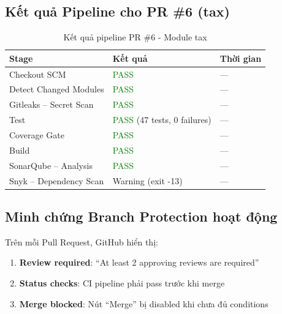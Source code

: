 
\subsection{Kết quả Pipeline cho PR \#6 (tax)}
\begin{table}[H]
\centering
\caption{Kết quả pipeline PR \#6 - Module tax}
\begin{tabular}{|l|l|l|}
\hline
\textbf{Stage} & \textbf{Kết quả} & \textbf{Thời gian} \\
\hline
Checkout SCM & \textcolor{green}{PASS} & --- \\
\hline
Detect Changed Modules & \textcolor{green}{PASS} & --- \\
\hline
Gitleaks -- Secret Scan & \textcolor{green}{PASS} & --- \\
\hline
Test & \textcolor{green}{PASS} (47 tests, 0 failures) & --- \\
\hline
Coverage Gate & \textcolor{green}{PASS} & --- \\
\hline
Build & \textcolor{green}{PASS} & --- \\
\hline
SonarQube -- Analysis & \textcolor{green}{PASS} & --- \\
\hline
Snyk -- Dependency Scan & Warning (exit -13) & --- \\
\hline
\end{tabular}
\end{table}


\subsection{Minh chứng Branch Protection hoạt động}
Trên mỗi Pull Request, GitHub hiển thị:
\begin{enumerate}[noitemsep]
    \item \textbf{Review required}: ``At least 2 approving reviews are required''
    \item \textbf{Status checks}: CI pipeline phải pass trước khi merge
    \item \textbf{Merge blocked}: Nút ``Merge'' bị disabled khi chưa đủ conditions
\end{enumerate}

